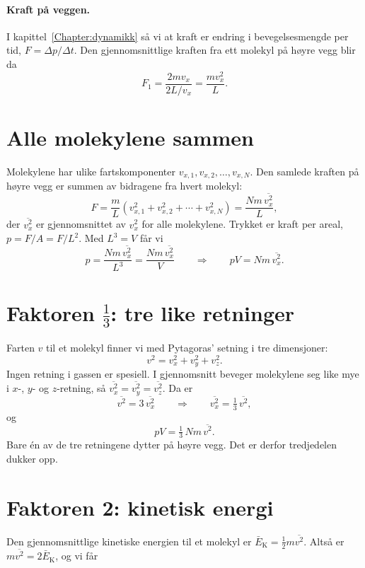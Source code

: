 \documentclass[../Main.tex]{subfiles}
\begin{document}
\paragraph{Kraft på veggen.} I kapittel~\ref{Chapter:dynamikk} så vi at kraft er endring i bevegelsesmengde per tid, $F = \Delta p/\Delta t$. Den gjennomsnittlige kraften fra ett molekyl på høyre vegg blir da
\[
  F_1 = \frac{2mv_x}{2L/v_x} = \frac{mv_x^2}{L} .
\]

\section{Alle molekylene sammen}

Molekylene har ulike fartskomponenter $v_{x,1}, v_{x,2}, \ldots, v_{x,N}$. Den samlede kraften på høyre vegg er summen av bidragene fra hvert molekyl:
\[
  F = \frac{m}{L}\left(v_{x,1}^2 + v_{x,2}^2 + \cdots + v_{x,N}^2\right) = \frac{Nm\,\overline{v_x^2}}{L} ,
\]
der $\overline{v_x^2}$ er gjennomsnittet av $v_x^2$ for alle molekylene. Trykket er kraft per areal, $p = F/A = F/L^2$. Med $L^3 = V$ får vi
\[
  p = \frac{Nm\,\overline{v_x^2}}{L^3} = \frac{Nm\,\overline{v_x^2}}{V}
  \qquad\Longrightarrow\qquad
  pV = Nm\,\overline{v_x^2} .
\]

\section{Faktoren \texorpdfstring{$\tfrac{1}{3}$}{1/3}: tre like retninger}

Farten $v$ til et molekyl finner vi med Pytagoras' setning i tre dimensjoner:
\[
  v^2 = v_x^2 + v_y^2 + v_z^2 .
\]
Ingen retning i gassen er spesiell. I gjennomsnitt beveger molekylene seg like mye i $x$-, $y$- og $z$-retning, så $\overline{v_x^2} = \overline{v_y^2} = \overline{v_z^2}$. Da er
\[
  \overline{v^2} = 3\,\overline{v_x^2}
  \qquad\Longrightarrow\qquad
  \overline{v_x^2} = \tfrac{1}{3}\,\overline{v^2} ,
\]
og
\[
  pV = \tfrac{1}{3}\,Nm\,\overline{v^2} .
\]
Bare én av de tre retningene dytter på høyre vegg. Det er derfor tredjedelen dukker opp.

\section{Faktoren 2: kinetisk energi}

Den gjennomsnittlige kinetiske energien til et molekyl er $\bar{E}_\text{K} = \tfrac{1}{2}m\overline{v^2}$. Altså er $m\overline{v^2} = 2\bar{E}_\text{K}$, og vi får
\end{document}
